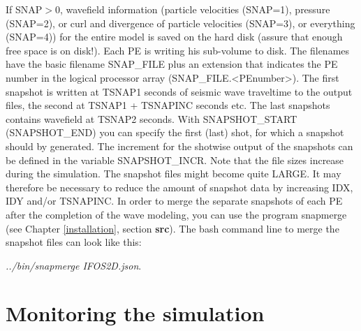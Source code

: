 {\color{red}{\begin{verbatim}
Default values are:
SNAP=0
IDX=1
IDY=1
\end{verbatim}}}

If SNAP$>0$, wavefield information (particle velocities (SNAP=1), pressure (SNAP=2), or curl and divergence of particle velocities (SNAP=3), or everything (SNAP=4)) for the entire model is saved on the hard disk (assure that enough free space is on disk!). Each PE is writing his sub-volume to disk. The filenames have the basic filename SNAP\_FILE plus an extension that indicates the PE number in the logical processor array (SNAP\_FILE.<PEnumber>). The first snapshot is written at TSNAP1 seconds of seismic wave traveltime to the output files, the second at TSNAP1 + TSNAPINC seconds etc. The last snapshots contains wavefield at TSNAP2 seconds. With SNAPSHOT\_START (SNAPSHOT\_END) you can specify the first (last) shot, for which a snapshot should by generated. The increment for the shotwise output of the snapshots can be defined in the variable SNAPSHOT\_INCR. Note that the file sizes increase during the simulation. The snapshot files might become quite LARGE. It may therefore be necessary to reduce the amount of snapshot data by increasing IDX, IDY and/or TSNAPINC. In order to merge the separate snapshots of each PE after the completion of the wave modeling, you can use the program snapmerge (see Chapter \ref{installation}, section \textbf{src}). The bash command line to merge the snapshot files can look like this: 
\newline

\textit{../bin/snapmerge IFOS2D.json}.


\section{Monitoring the simulation}
{\color{blue}{\begin{verbatim}
"Monitoring the simulation" : "comment",
			"LOG_FILE" : "log/2layer.log",
			"LOG" : "1",
\end{verbatim}}}

{\color{red}{\begin{verbatim}
Default values are:
LOG=1
LOG_FILE="log/LOG_FILE"
\end{verbatim}}}

